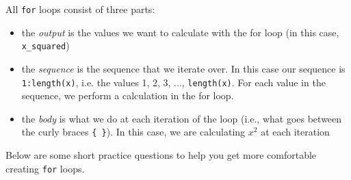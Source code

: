 \documentclass[11pt]{article}
\begin{document}
\noindent All \verb;for; loops consist of three parts: 
\begin{itemize}
\item the \textit{output} is the values we want to calculate with the for loop (in this case, \verb;x_squared;)
\item the \textit{sequence} is the sequence that we iterate over. In this case our sequence is \verb;1:length(x);, i.e. the values 1, 2, 3, ..., \verb;length(x);. For each value in the sequence, we perform a calculation in the for loop.
\item the \textit{body} is what we do at each iteration of the loop (i.e., what goes between the curly braces \verb;{ };). In this case, we are calculating $x^2$ at each iteration
\end{itemize}

\noindent Below are some short practice questions to help you get more comfortable creating \verb;for; loops.
\end{document}
